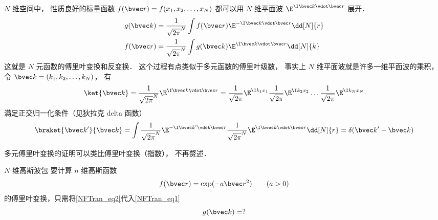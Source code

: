 

$N$ 维空间中， 性质良好的标量函数 $f(\bvec r) = f(x_1, x_2, \dots, x_N)$ 都可以用 $N$ 维平面波 $\E^{\I \bvec k\vdot \bvec r}$ 展开．
\begin{align}
g(\bvec k) &= \frac{1}{\sqrt{2\pi}^N} \int f(\bvec r) \E^{-\I \bvec k \vdot \bvec r} \dd[N]{r}\label{NFTran_eq1}\\
f(\bvec r) &= \frac{1}{\sqrt{2\pi}^N} \int g(\bvec k) \E^{\I \bvec k \vdot \bvec r} \dd[N]{k}
\end{align}
这就是 $N$ 元函数的傅里叶变换和反变换． 这个过程有点类似于多元函数的傅里叶级数， 事实上 $N$ 维平面波就是许多一维平面波的乘积， 令 $\bvec k = (k_1, k_2, \dots, k_N)$， 有
\begin{equation}
\ket{\bvec k} = \frac{1}{\sqrt{2\pi}^N}\E^{\I \bvec k \vdot \bvec r} = \frac{1}{\sqrt{2\pi}} \E^{\I k_1 x_1} \frac{1}{\sqrt{2\pi}} \E^{\I k_2 x_2} \dots \frac{1}{\sqrt{2\pi}} \E^{\I k_N x_N}
\end{equation}
满足正交归一化条件（见狄拉克 delta 函数）
\begin{equation}
\braket{\bvec k'}{\bvec k} = \int \frac{1}{\sqrt{2\pi}^N}\E^{-\I \bvec k' \vdot \bvec r} \frac{1}{\sqrt{2\pi}^N}\E^{\I \bvec k \vdot \bvec r} \dd[N]{r} = \delta(\bvec k'- \bvec k)
\end{equation}

多元傅里叶变换的证明可以类比傅里叶变换（指数）， 不再赘述．

\begin{example}{$N$ 维高斯波包}
要计算 $n$ 维高斯函数
\begin{equation}\label{NFTran_eq2}
f(\bvec r) = \exp(-a\bvec r^2) \qquad (a > 0)
\end{equation}
的傅里叶变换，只需将\autoref{NFTran_eq2}代入\autoref{NFTran_eq1}
\begin{equation}
g(\bvec k) = ?
\end{equation}
\end{example}
